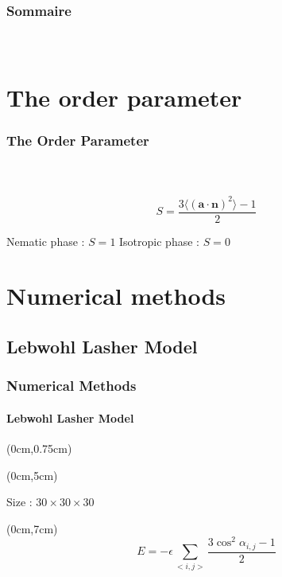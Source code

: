 \documentclass{beamer}
\begin{document}
\begin{frame}
	\frametitle{Sommaire}
	\framesubtitle{\ }
	\tableofcontents
\end{frame}

\section{The order parameter}

\begin{frame}
	\frametitle{The Order Parameter}
	\framesubtitle{\ }
	
\center 



\begin{equation*}
S = \frac{3 \langle (\bm{a}\cdot \bm{n})^2\rangle -1}{2}
\end{equation*}

\vspace{0.75cm}
Nematic phase : $S=1$ \hspace{0.9cm}
Isotropic phase : $S=0$
\end{frame}

\section{Numerical methods}
\subsection{Lebwohl Lasher Model}
\begin{frame}
	\frametitle{Numerical Methods}
	\framesubtitle{Lebwohl Lasher Model}

\begin{textblock*}{13cm}(0cm,0.75cm) %
\begin{center}
	
\end{center}
\end{textblock*}

\begin{textblock*}{13cm}(0cm,5cm) %
\begin{center}
	Size : $ 30 \times 30 \times 30$
\end{center}
\end{textblock*}

\begin{textblock*}{13cm}(0cm,7cm) %
\begin{equation*}
E = - \epsilon\sum_{<i,j>} \frac{3\cos^2\alpha_{i,j}-1}{2}
\end{equation*}
\end{textblock*}
\end{frame}
\end{document}

